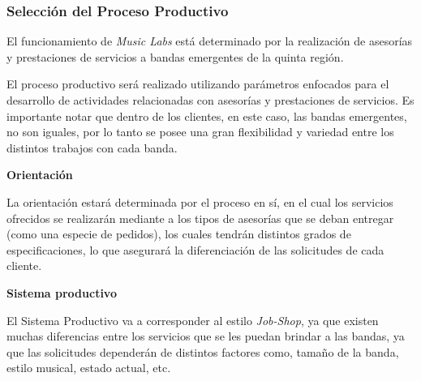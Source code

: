 \subsubsection{Selección del Proceso Productivo}

El funcionamiento de \emph{Music Labs} está determinado por la realización
de asesorías y prestaciones de servicios a bandas emergentes de la quinta región.

El proceso productivo será realizado utilizando parámetros enfocados
para el desarrollo de actividades relacionadas con asesorías y prestaciones
de servicios. Es importante notar que dentro de los clientes, en este caso,
las bandas emergentes, no son iguales, por lo tanto se posee una gran
flexibilidad y variedad entre los distintos trabajos con cada banda.

{ \bf Orientación}

La orientación estará determinada por el proceso en sí, en el cual
los servicios ofrecidos se realizarán mediante a los tipos de asesorías
que se deban entregar (como una especie de pedidos), los cuales
tendrán distintos grados de especificaciones, lo que asegurará
la diferenciación de las solicitudes de cada cliente.


{ \bf Sistema productivo}

El Sistema Productivo va a corresponder al estilo \emph{Job-Shop}, ya que existen
muchas diferencias entre los servicios que se les puedan brindar a las bandas, ya
que las solicitudes dependerán de distintos factores como, tamaño de la banda, estilo
musical, estado actual, etc.

